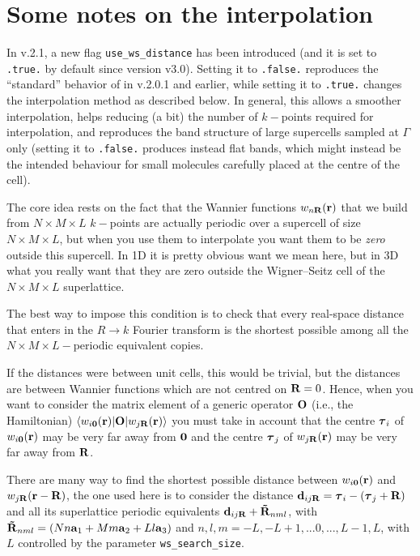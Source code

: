 \chapter{\label{chap:interpolation}Some notes on the interpolation}

In \wannier{} v.2.1, a new flag {\tt use\_ws\_distance} has been 
introduced (and it is set to {\tt .true.} by default since
version v3.0). Setting it to {\tt .false.} reproduces the 
``standard'' behavior of \wannier{} in v.2.0.1 and earlier,
while setting it to {\tt .true.} changes the interpolation method
as described below. In general, this allows a smoother interpolation,
helps reducing (a bit) the number of $k-$points required for interpolation,
and reproduces the band structure of large supercells sampled at $\Gamma$ 
only (setting it to {\tt .false.} produces instead flat bands, which 
might instead be the intended behaviour for small molecules carefully
placed at the centre of the cell).

The core idea rests on the fact that the Wannier functions $w_{n\bm{\mathrm{R}}}(\bm{\mathrm{r}})$
that we build from $N\times M\times L$ $k-$points are actually periodic 
over a supercell of size $N\times M\times L$, but when you use 
them to interpolate you want them to be \emph{zero} outside this supercell. 
In 1D it is pretty obvious want we mean here, but in 3D what you really 
want that they are zero outside the Wigner--Seitz cell of the 
$N\times M\times L$ superlattice.

The best way to impose this condition is to check that every real-space 
distance that enters in the $R\to k$ Fourier transform is the shortest possible 
among all the $N\times M\times L-$periodic equivalent copies. 

If the distances were between unit cells, this would be trivial, but the 
distances are between Wannier functions which are not centred on $\bm{\mathrm{R}}=0$. 
Hence, when you want to consider the matrix element of a generic operator $\bm{\mathrm{O}}$
(i.e., the Hamiltonian)  $\langle w_{i\bm{\mathrm{0}}}(\bm{\mathrm{r}})|\bm{\mathrm{O}}|w_{j\bm{\mathrm{R}}}(\bm{\mathrm{r}})\rangle$ 
you must take in account that the centre $\bm{\mathrm{\tau}}_i$ of $w_{i\bm{\mathrm{0}}}(\bm{\mathrm{r}})$ may 
be very far away from $\bm{\mathrm{0}}$ and the centre $\bm{\mathrm{\tau}}_j$ of $w_{j\bm{\mathrm{R}}}(\bm{\mathrm{r}})$
may be very far away from $\bm{\mathrm{R}}$.

There are many way to find the shortest possible distance between $w_{i\bm{\mathrm{0}}}(\bm{\mathrm{r}})$ and 
$w_{j\bm{\mathrm{R}}}(\bm{\mathrm{r}}-\bm{\mathrm{R}})$, the one used here is to consider the distance
$\bm{\mathrm{d}}_{ij\bm{\mathrm{R}}} = \bm{\mathrm{\tau}}_i - (\bm{\mathrm{\tau}}_j+\bm{\mathrm{R}})$
and all its superlattice periodic equivalents
$\bm{\mathrm{d}}_{ij\bm{\mathrm{R}}}+ \bm{\mathrm{\tilde R}}_{nml}$, with 
$\bm{\mathrm{\tilde R}}_{nml} = (Nn\bm{\mathrm{a}}_1 + Mm\bm{\mathrm{a}}_2 + Ll\bm{\mathrm{a}}_3)$
and $n,l,m = {-L,-L+1,...0,...,L-1,L}$, with $L$ controlled by the parameter {\tt ws\_search\_size}.

